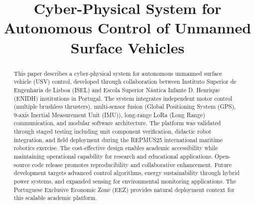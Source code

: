 \documentclass[conference]{IEEEtran}
\begin{document}
\title{Cyber-Physical System for Autonomous Control of Unmanned Surface Vehicles}

\author{
\and
{}
\and
{}
}

\maketitle

\begin{abstract}
This paper describes a cyber-physical system for autonomous unmanned surface vehicle (USV) control, developed through collaboration between Instituto Superior de Engenharia de Lisboa (ISEL) and Escola Superior Náutica Infante D. Henrique (ENIDH) institutions in Portugal. The system integrates independent motor control (multiple brushless thrusters), multi-sensor fusion (Global Positioning System (GPS), 9-axis Inertial Measurement Unit (IMU)), long-range LoRa (Long Range) communication, and modular software architecture. The platform was validated through staged testing including unit component verification, didactic robot integration, and field deployment during the REPMUS25 international maritime robotics exercise. The cost-effective design enables academic accessibility while maintaining operational capability for research and educational applications. Open-source code release promotes reproducibility and collaborative enhancement. Future development targets advanced control algorithms, energy sustainability through hybrid power systems, and expanded sensing for environmental monitoring applications. The Portuguese Exclusive Economic Zone (EEZ) provides natural deployment context for this scalable academic platform.
\end{abstract}
\end{document}

